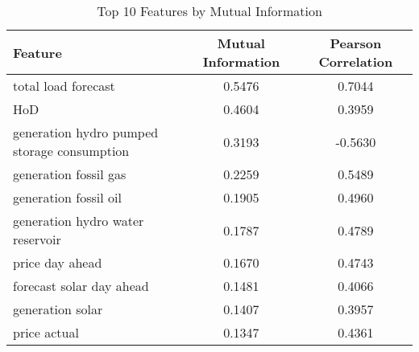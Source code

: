 \begin{table}[h]
\centering
\caption{Top 10 Features by Mutual Information}
\label{tab:top_features}
\begin{tabular}{lcc}
\toprule
Feature & Mutual Information & Pearson Correlation \\
\midrule
total load forecast & 0.5476 & 0.7044 \\
HoD & 0.4604 & 0.3959 \\
generation hydro pumped storage consumption & 0.3193 & -0.5630 \\
generation fossil gas & 0.2259 & 0.5489 \\
generation fossil oil & 0.1905 & 0.4960 \\
generation hydro water reservoir & 0.1787 & 0.4789 \\
price day ahead & 0.1670 & 0.4743 \\
forecast solar day ahead & 0.1481 & 0.4066 \\
generation solar & 0.1407 & 0.3957 \\
price actual & 0.1347 & 0.4361 \\
\bottomrule
\end{tabular}
\end{table}